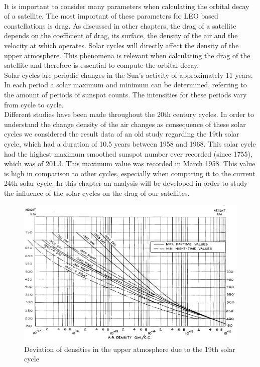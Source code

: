 \paragraph{ }

It is important to consider many parameters when calculating the orbital decay of a satellite. The most important of these parameters for LEO based constellations is drag. As discussed in other chapters, the drag of a satellite depends on the coefficient of drag, its surface, the density of the air and the velocity at which operates. Solar cycles will directly affect the density of the upper atmosphere. This phenomena is relevant when calculating the drag of the satellite and therefore is essential to compute the orbital decay. \\

Solar cycles are periodic changes in the Sun's activity of approximately 11 years. In each period a solar maximum and minimum can be determined, referring to the amount of periods of sunspot counts. The intensities for these periods vary from cycle to cycle. \\



Different studies have been made throughout the 20th century cycles. In order to understand the change  density of the air changes as consequence of these solar cycles we considered the result data of an old study regarding the 19th solar cycle, which had a duration of 10.5 years between 1958 and 1968. This solar cycle had the highest maximum smoothed sunspot number ever recorded (since 1755), which was of 201.3. This maximum value was recorded in March 1958. This value is high in comparison to other cycles, especially when comparing it to the current 24th solar cycle. In this chapter an analysis will be developed in order to study the influence of the solar cycles on the drag of our satellites. 



\begin{figure}[h]
\includegraphics[width=14cm]{solarcycles}
\centering
\caption{Deviation of densities in the upper atmosphere due to the 19th solar cycle}

\end{figure}


